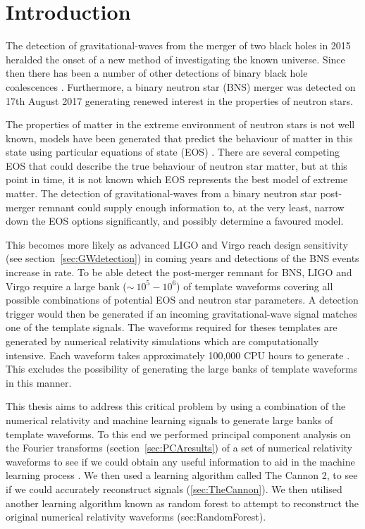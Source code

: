 \pagebreak
\section{Introduction}

	The detection of gravitational-waves from  the merger of two black holes in 2015 \citep{GW150914} heralded the onset of a new method of investigating the known universe. Since then there has been a number of other detections of binary black hole coalescences \citep{GW151226, GW170104,GW170814}. Furthermore, a binary neutron star (BNS) merger was detected on 17th August 2017 \citep{GW170817} generating renewed interest in the properties of neutron stars.\par
	
	The properties of matter in the extreme environment of neutron stars is not well known, models have been generated that predict the behaviour of matter in this state using particular equations of state (EOS) . There are several competing EOS that could describe the true behaviour of neutron star matter, but at this point in time, it is not known which EOS represents the best model of extreme matter. The detection of gravitational-waves from a binary neutron star post-merger remnant could supply enough information to, at the very least, narrow down the EOS options significantly, and possibly determine a favoured model. \par
	This becomes more likely as advanced LIGO and Virgo reach design sensitivity (see section~\ref{sec:GWdetection}) in coming years and detections of the BNS events increase in rate. To be able detect the post-merger remnant for BNS, LIGO and Virgo require a large bank ($\sim\ 10^5-10^6$) of template waveforms covering all possible combinations of potential EOS and neutron star parameters. A detection trigger would then be generated if an incoming gravitational-wave signal matches one of the template signals. The waveforms required for theses templates are generated by numerical relativity simulations which are computationally intensive. Each waveform takes approximately 100,000 CPU hours to generate \citep{Takami2015}. This excludes the possibility of generating the large banks of template waveforms in this manner. \par
	This thesis aims to address this critical problem by using a combination of the numerical relativity and machine learning signals to generate large banks of template waveforms. To this end we  performed principal component analysis on the Fourier transforms (section~\ref{sec:PCAresults}) of a set of numerical relativity waveforms to see if we could obtain any useful information to aid in the machine learning process . We then used a learning algorithm called The Cannon 2, to see if we could accurately reconstruct signals (\ref{sec:TheCannon}). We then utilised another learning algorithm known as random forest to attempt to reconstruct the original numerical relativity waveforms ({sec:RandomForest}).



